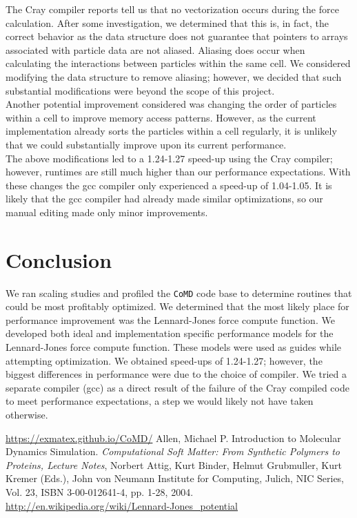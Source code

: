 \documentclass[12pt]{article}
\begin{document}
The Cray compiler reports tell us that no vectorization occurs during
the force calculation. After some investigation, we determined that
this is, in fact, the correct behavior as the data structure does not
guarantee that pointers to arrays associated with particle data are
not aliased.  Aliasing does occur when calculating the interactions
between particles within the same cell. We considered modifying the
data structure to remove aliasing; however, we decided that such
substantial modifications were beyond the scope of this project.
\\

 Another potential improvement considered was changing the order of
particles within a cell to improve memory access patterns. However, as the
current implementation already sorts the particles within a cell regularly, it is unlikely 
that we could substantially improve upon its current performance. \\

 The above modifications led to a 1.24-1.27 speed-up using
the Cray compiler; however, runtimes are still much higher than our
performance expectations. With these changes the gcc compiler only
experienced a speed-up of 1.04-1.05. It is likely that the gcc
compiler had already made similar optimizations, so our manual editing
made only minor improvements.

\section{Conclusion}
We ran scaling studies and profiled the \texttt{CoMD} code base to
determine routines that could be most profitably optimized. We
determined that the most likely place for performance improvement was
the Lennard-Jones force compute function. We developed both ideal and
implementation specific performance models for the Lennard-Jones force
compute function. These models were used as guides while attempting
optimization. We obtained speed-ups of 1.24-1.27; however, the biggest
differences in performance were due to the choice of compiler. We
tried a separate compiler (gcc) as a direct result of the failure of
the Cray compiled code to meet performance expectations, a step we
would likely not have taken otherwise.
\\


\begin{thebibliography}{}
 \url{https://exmatex.github.io/CoMD/}
     Allen, Michael P. Introduction to Molecular Dynamics Simulation. 
      {\it Computational Soft Matter: From Synthetic Polymers to Proteins, Lecture Notes}, 
      Norbert Attig, Kurt Binder, Helmut Grubmuller, Kurt Kremer (Eds.),
      John von Neumann Institute for Computing, Julich,
      NIC Series, Vol. 23, ISBN 3-00-012641-4, pp. 1-28, 2004.
       \url{http://en.wikipedia.org/wiki/Lennard-Jones_potential}
\end{thebibliography}
\end{document}
